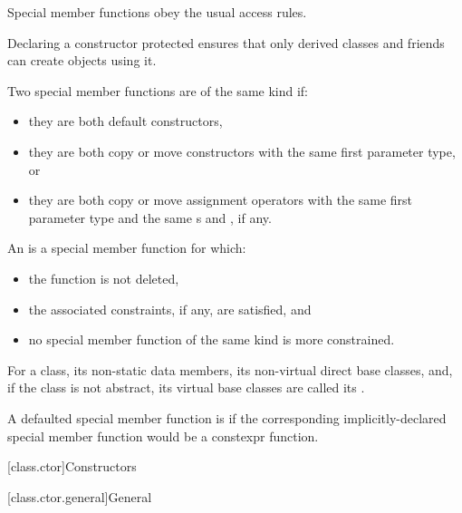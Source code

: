\pnum
{}%
Special member functions obey the usual access rules.
\begin{example}
Declaring a constructor protected
ensures that only derived classes and friends can create objects using it.
\end{example}

\pnum
Two special member functions are of the same kind if:
\begin{itemize}
\item they are both default constructors,
\item they are both copy or move constructors
with the same first parameter type, or
\item they are both copy or move assignment operators
with the same first parameter type
and the same s and , if any.
\end{itemize}

\pnum
An  is a special member function for which:
\begin{itemize}
\item the function is not deleted,
\item the associated constraints, if any, are satisfied, and
\item no special member function of the same kind is more constrained.
\end{itemize}

\pnum
For a class, its non-static data members, its non-virtual direct base classes,
and, if the class is not abstract, its virtual base
classes are called its .

\pnum
A defaulted special member function is
%
if the corresponding implicitly-declared special member function
would be a constexpr function.

[class.ctor]{Constructors}%

[class.ctor.general]{General}%
%
%

